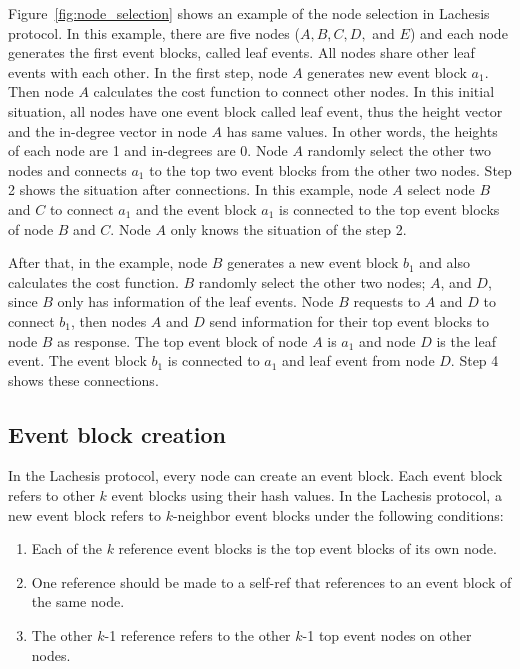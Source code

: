 \documentclass{article}
\begin{document}
Figure~\ref{fig:node_selection} shows an example of the node selection in Lachesis protocol. In this example, there are five nodes ($A, B, C, D,$ and $E$) and each node generates the first event blocks, called leaf events. All nodes share other leaf events with each other. In the first step, node $A$ generates new event block $a_1$. Then node $A$ calculates the cost function to connect other nodes. In this initial situation, all nodes have one event block called leaf event, thus the height vector and the in-degree vector in node $A$ has same values. In other words, the heights of each node are 1 and in-degrees are 0. Node $A$ randomly select the other two nodes and connects $a_1$ to the top two event blocks from the other two nodes. Step 2 shows the situation after connections. In this example, node $A$ select node $B$ and $C$ to connect $a_1$ and the event block $a_1$ is connected to the top event blocks of node $B$ and $C$. Node $A$ only knows the situation of the step 2. 

After that, in the example, node $B$ generates a new event block $b_1$ and also calculates the cost function. $B$ randomly select the other two nodes; $A$, and $D$, since $B$ only has information of the leaf events. Node $B$ requests to $A$ and $D$ to connect $b_1$, then nodes $A$ and $D$ send information for their top event blocks to node $B$ as response. The top event block of node $A$ is $a_1$ and node $D$ is the leaf event. The event block $b_1$ is connected to $a_1$ and leaf event from node $D$. Step 4 shows these connections. 

\subsection{Event block creation}
In the Lachesis protocol, every node can create an event block. Each event block refers to other $k$ event blocks using their hash values. In the Lachesis protocol, a new event block refers to $k$-neighbor event blocks under the following conditions:

\begin{enumerate}
\item Each of the $k$ reference event blocks is the top event blocks of its own node.
\item One reference should be made to a self-ref that references to an event block of the same node. 
\item The other $k$-1 reference refers to the other $k$-1 top event nodes on other nodes.
\end{enumerate}
\end{document}

